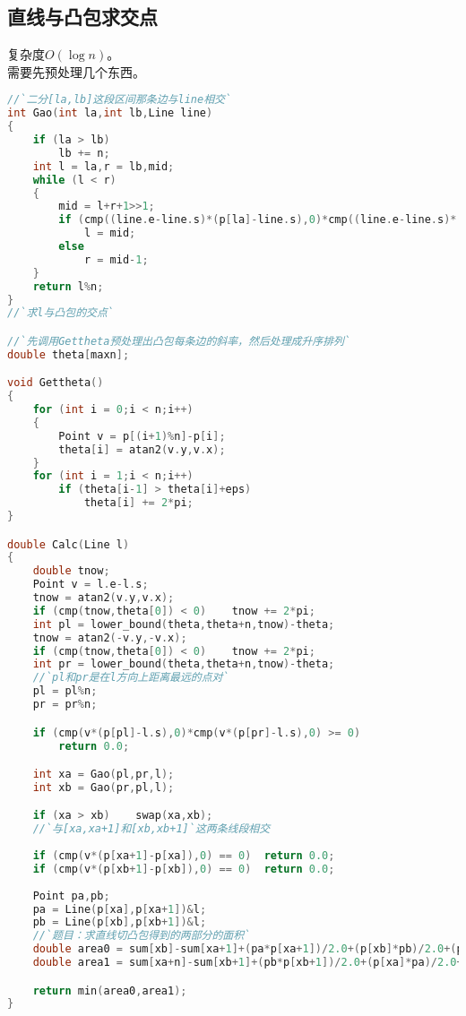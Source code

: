 \subsection{直线与凸包求交点}
    复杂度$O(\log{n})$。\\
    需要先预处理几个东西。\\
    \begin{lstlisting}[language=c++]
//`二分[la,lb]这段区间那条边与line相交`
int Gao(int la,int lb,Line line)
{
    if (la > lb)
        lb += n;
    int l = la,r = lb,mid;
    while (l < r)
    {
        mid = l+r+1>>1;
        if (cmp((line.e-line.s)*(p[la]-line.s),0)*cmp((line.e-line.s)*(p[mid]-line.s),0) >= 0)
            l = mid;
        else
            r = mid-1;
    }
    return l%n;
}
//`求l与凸包的交点`

//`先调用Gettheta预处理出凸包每条边的斜率，然后处理成升序排列`
double theta[maxn];

void Gettheta()
{
    for (int i = 0;i < n;i++)
    {
        Point v = p[(i+1)%n]-p[i];
        theta[i] = atan2(v.y,v.x);
    }
    for (int i = 1;i < n;i++)
        if (theta[i-1] > theta[i]+eps)
            theta[i] += 2*pi;
}

double Calc(Line l)
{
    double tnow;
    Point v = l.e-l.s;
    tnow = atan2(v.y,v.x);
    if (cmp(tnow,theta[0]) < 0)    tnow += 2*pi;
    int pl = lower_bound(theta,theta+n,tnow)-theta;
    tnow = atan2(-v.y,-v.x);
    if (cmp(tnow,theta[0]) < 0)    tnow += 2*pi;
    int pr = lower_bound(theta,theta+n,tnow)-theta;
    //`pl和pr是在l方向上距离最远的点对`
    pl = pl%n;
    pr = pr%n;

    if (cmp(v*(p[pl]-l.s),0)*cmp(v*(p[pr]-l.s),0) >= 0)
        return 0.0;

    int xa = Gao(pl,pr,l);
    int xb = Gao(pr,pl,l);

    if (xa > xb)    swap(xa,xb);
    //`与[xa,xa+1]和[xb,xb+1]`这两条线段相交
    
    if (cmp(v*(p[xa+1]-p[xa]),0) == 0)  return 0.0;
    if (cmp(v*(p[xb+1]-p[xb]),0) == 0)  return 0.0;
    
    Point pa,pb;
    pa = Line(p[xa],p[xa+1])&l;
    pb = Line(p[xb],p[xb+1])&l;
    //`题目：求直线切凸包得到的两部分的面积`
    double area0 = sum[xb]-sum[xa+1]+(pa*p[xa+1])/2.0+(p[xb]*pb)/2.0+(pb*pa)/2.0;
    double area1 = sum[xa+n]-sum[xb+1]+(pb*p[xb+1])/2.0+(p[xa]*pa)/2.0+(pa*pb)/2.0;

    return min(area0,area1);
}
    \end{lstlisting}